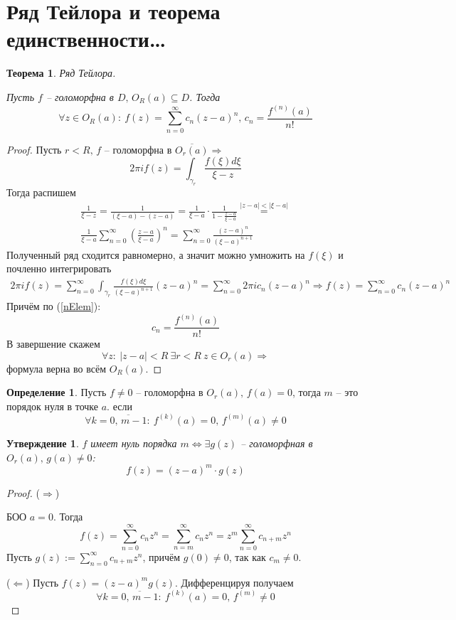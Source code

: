 \documentclass[a4paper,12pt]{article}
\theoremstyle{plain}
\newtheorem{theorem}{Теорема}[section]
\newtheorem{proposition}{Утверждение}[section]
\theoremstyle{definition}
\newtheorem{definition}{Определение}[section]
\theoremstyle{remark}
\begin{document}
\section{Ряд Тейлора и теорема единственности\dots}
\begin{theorem}\label{Taylor}
	Ряд Тейлора.

	Пусть $f$ -- голоморфна в $D,\, O_R(a) \subseteq D$. Тогда
	\[
		\forall z \in O_R(a) :\: f(z) = \sum_{n = 0}^\infty c_n(z - a)^n,\, c_n = \frac{f^{(n)}(a)}{n!}
	\]
\end{theorem}

\begin{proof}
	Пусть $r < R,\, f$ -- голоморфна в $\overline{O_r(a)} \Rightarrow$
	\[
		2\pi if(z) = \int_{\gamma_r}\frac{f(\xi)d\xi}{\xi - z}
	\]
	Тогда распишем
	\begin{align*}
		\frac{1}{\xi - z} = \frac{1}{(\xi - a) - (z - a)} = \frac{1}{\xi - a}\cdot\frac{1}{1 - \frac{z - a}{\xi - a}} \overset{\vert z - a\vert < \vert \xi - a\vert}{=} \\
		\frac{1}{\xi - a}\sum_{n = 0}^\infty \left(\frac{z - a}{\xi - a}\right)^n = \sum_{n = 0}^\infty \frac{(z - a)^n}{(\xi - a)^{n + 1}}
	\end{align*}
	Полученный ряд сходится равномерно, а значит можно умножить на $f(\xi)$ и почленно интегрировать
	\begin{align*}
		2\pi i f(z) = \sum_{n = 0}^\infty \int_{\gamma_r}\frac{f(\xi)d\xi}{(\xi - a)^{n + 1}}(z - a)^n = \sum_{n = 0}^\infty 2\pi i c_n(z - a)^n \Rightarrow f(z) = \sum_{n = 0}^\infty c_n(z - a)^n
	\end{align*}
	Причём по (\ref{nElem}):
	\[
		c_n = \frac{f^{(n)}(a)}{n!}
	\]
	В завершение скажем
	\[
		\forall z :\: \vert z - a\vert < R \: \exists r < R \: z \in O_r(a) \Rightarrow
	\]
	формула верна во всём $O_R(a)$.
\end{proof}

\begin{definition}
	Пусть $f \neq 0$ -- голоморфна в $O_r(a),\, f(a) = 0$, тогда $m$ -- это порядок нуля в точке $a$. если
	\[
		\forall k = \overline{0,\, m - 1} :\: f^{(k)}(a) = 0,\, f^{(m)}(a) \neq 0
	\]
\end{definition}

\begin{proposition}
	$f$ имеет нуль порядка $m \Leftrightarrow \exists g(z)$ -- голоморфная в $O_r(a),\, g(a) \neq 0$:
	\[
		f(z) = (z - a)^m\cdot g(z)
	\]
\end{proposition}

\begin{proof}
	($\Rightarrow$)

	БОО $a = 0$. Тогда
	\[
		f(z) = \sum_{n = 0}^\infty c_nz^n = \sum_{n = m}^\infty c_nz^n = z^m \sum_{n = 0}^\infty c_{n + m}z^n
	\]
	Пусть $g(z) :=\sum_{n = 0}^\infty c_{n + m}z^n$, причём $g(0) \neq 0$, так как $c_m \neq 0$.

	($\Leftarrow$) Пусть $f(z) = (z - a)^mg(z)$. Дифференцируя получаем
	\[
		\forall k = \overline{0,\,m-1} :\: f^{(k)}(a) = 0,\, f^{(m)} \neq 0
	\]
\end{proof}
\end{document}
